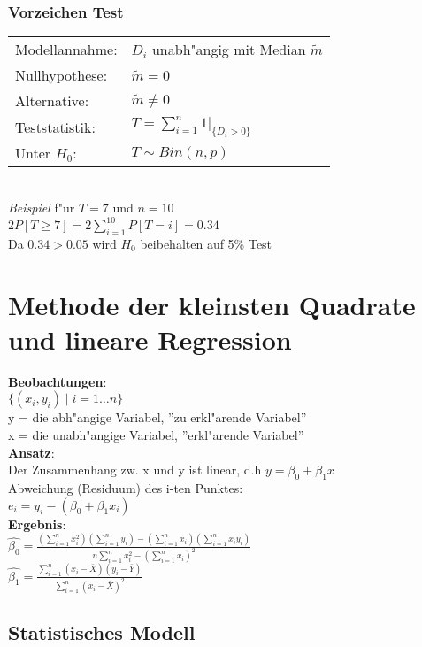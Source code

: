 \documentclass[10pt, a4paper, twocolumn]{scrartcl}
\begin{document}
\subsubsection{Vorzeichen Test}


\begin{tabular}{ll}
 Modellannahme:&	$D_i$ unabh"angig mit Median $\tilde{m}$\\
 Nullhypothese:&	$\tilde{m}=0$\\
 Alternative:&		$\tilde{m}\neq 0$\\
 Teststatistik:&	$T=\sum\limits^{n}_{i=1}1|_{\{D_i>0\}}$\\
 Unter $H_0$:&		$T\sim Bin(n,p)$
\end{tabular}\\

\textit{Beispiel} f"ur $T=7$ und $n=10$\\
$2 P[T\geq 7]=2\sum\limits^{10}_{i=1}P[T=i]=0.34$\\
Da $0.34>0.05$ wird $H_0$ beibehalten auf 5\% Test

\section{Methode der kleinsten Quadrate und lineare Regression}

\textbf{Beobachtungen}:\\
$\{(x_i,y_i)\mid i=1\ldots n\}$\\
y = die abh"angige Variabel, ''zu erkl"arende Variabel''\\
x = die unabh"angige Variabel, ''erkl"arende Variabel''\\

\textbf{Ansatz}:\\
Der Zusammenhang zw. x und y ist linear, d.h $y=\beta_0+\beta_1 x$\\

Abweichung (Residuum) des i-ten Punktes:\\
$e_i=y_i-(\beta_0+\beta_1 x_i)$\\

\textbf{Ergebnis}:\\
$\hat{\beta_0}=\frac{(\sum\limits^n_{i=1}x_i^2)(\sum\limits^n_{i=1}y_i)-(\sum\limits^n_{i=1}x_i)(\sum\limits^n_{i=1}x_iy_i)}{n\sum\limits^n_{i=1}x_i^2-(\sum\limits^n_{i=1}x_i)^2}$\\
$\hat{\beta_1}=\frac{\sum\limits^n_{i=1}(x_i-\bar{X})(y_i-\bar{Y})}{\sum\limits^n_{i=1}(x_i-\bar{X})^2}$

\subsection{Statistisches Modell}
\end{document}
